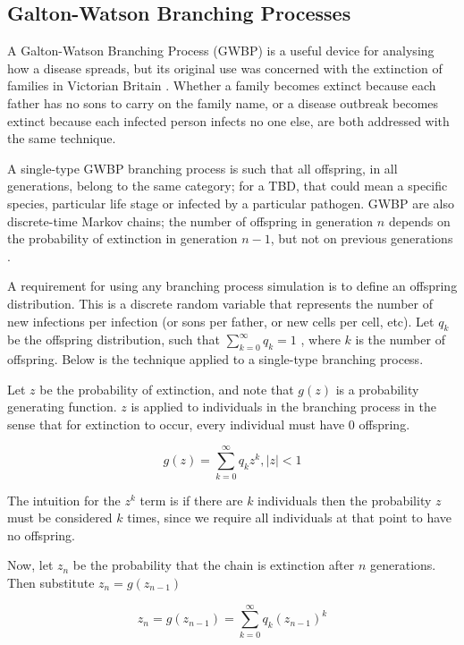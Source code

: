 \documentclass{article}
\begin{document}
\subsection{Galton-Watson Branching Processes}

A Galton-Watson Branching Process (GWBP) is a useful device for analysing how a disease spreads, but its original use was concerned with the extinction of families in Victorian Britain \cite{Athreya1972}. Whether a family becomes extinct because each father has no sons to carry on the family name, or a disease outbreak becomes extinct because each infected person infects no one else, are both addressed with the same technique.

A single-type GWBP branching process is such that all offspring, in all generations, belong to the same category; for a TBD, that could mean a specific species, particular life stage or infected by a particular pathogen. GWBP are also discrete-time Markov chains; the number of offspring in generation $ n $ depends on the probability of extinction in generation $ n - 1 $, but not on previous generations \cite{Allen2019}.

A requirement for using any branching process simulation is to define an offspring distribution. This is a discrete random variable that represents the number of new infections per infection (or sons per father, or new cells per cell, etc). Let $ q_k $ be the offspring distribution, such that $ \sum_{k=0}^\infty q_k = 1 $ \cite{Diekman2000}, where $ k $ is the number of offspring. Below is the technique applied to a single-type branching process.

Let $ z $ be the probability of extinction, and note that $ g(z) $ is a probability generating function. $ z $ is applied to individuals in the branching process in the sense that for extinction to occur, every individual must have $ 0 $ offspring.

\begin{equation}\label{BranchingProcessPGF}
    g(z) = \sum_{k=0}^\infty q_k z^k, |z| < 1
\end{equation}

The intuition for the $ z^k $ term is if there are $ k $ individuals then the probability $ z $ must be considered $ k $ times, since we require all individuals at that point to have no offspring.

Now, let $ z_n $ be the probability that the chain is extinction after $ n $ generations. Then substitute $ z_n = g(z_{n-1})$

\begin{equation}\label{BranchingProcessRecurrence}
    z_{n} = g(z_{n-1}) = \sum_{k=0}^\infty q_k (z_{n-1})^k
\end{equation}
\end{document}
